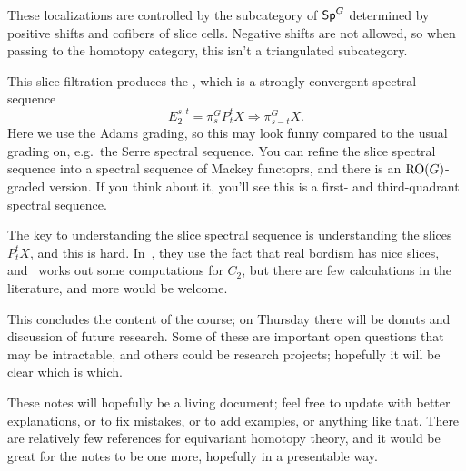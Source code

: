These localizations are controlled by the subcategory of $\mathsf{Sp}^G$ determined by positive shifts and cofibers of
slice cells. Negative shifts are not allowed, so when passing to the homotopy category, this isn't a triangulated
subcategory.

This slice filtration produces the , which is a strongly convergent spectral sequence
\begin{equation}
\label{SlSS}
E_2^{s,t} = \pi_s^G P_t^tX\Longrightarrow \pi_{s-t}^G X.
\end{equation}
Here we use the Adams grading, so this may look funny compared to the usual grading on, e.g.\ the Serre spectral
sequence. You can refine the slice spectral sequence into a spectral sequence of Mackey functoprs, and there is an
$\mathrm{RO}(G)$-graded version. If you think about it, you'll see this is a first- and third-quadrant spectral sequence.

The key to understanding the slice spectral sequence is understanding the slices $P_t^tX$, and this is hard.
In~\cite{HHR}, they use the fact that real bordism has nice slices, and~ works out some computations
for $C_2$, but there are few calculations in the literature, and more would be welcome.

This concludes the content of the course; on Thursday there will be donuts and discussion of future research. Some
of these are important open questions that may be intractable, and others could be research projects; hopefully
it will be clear which is which.

These notes will hopefully be a living document; feel free to update with better explanations, or to fix mistakes,
or to add examples, or anything like that. There are relatively few references for equivariant homotopy theory, and
it would be great for the notes to be one more, hopefully in a presentable way.
